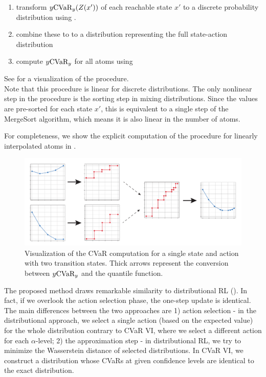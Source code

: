 \begin{enumerate}
\item transform $y \text{CVaR}_y(Z(x'))$ of each reachable state $x'$ to a discrete probability distribution using .
\item combine these to to a distribution representing the full state-action distribution
\item compute $y \text{CVaR}_y$ for all atoms using 
\end{enumerate}
See  for a visualization of the procedure. 
\\
Note that this procedure is linear for discrete distributions. The only nonlinear step in the procedure is the sorting step in mixing distributions. Since the values are pre-sorted for each state $x'$, this is equivalent to a single step of the MergeSort algorithm, which means it is also linear in the number of atoms.

For completeness, we show the explicit computation of the procedure for linearly interpolated atoms in .


\begin{figure}
\center
\includegraphics[width=\linewidth]{gfx/cvar_vi_conversion.pdf}
\caption{Visualization of the CVaR computation for a single state and action with two transition states. Thick arrows represent the conversion between $y\text{CVaR}_y$ and the quantile function.}
\label{fig:cvarcomputation}
\end{figure}

The proposed method draws remarkable similarity to distributional RL (). In fact, if we overlook the action selection phase, the one-step update is identical. The main differences between the two approaches are 1) action selection - in the distributional approach, we select a single action (based on the expected value) for the whole distribution contrary to CVaR VI, where we select a different action for each $\alpha$-level; 2) the approximation step - in distributional RL, we try to minimize the Wasserstein distance of selected distributions. In CVaR VI, we construct a distribution whose CVaRs at given confidence levels are identical to the exact distribution.

